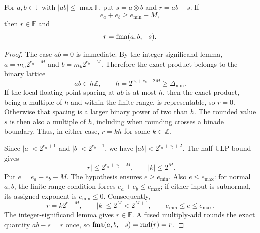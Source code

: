 \begin{theorem}
For $a, b\in\mathbb F$ with $|ab|\le\max\mathbb F$, put
$s=a\otimes b$ and $r=ab-s$. If
\[
 e_a+e_b\ge e_{\min}+M,
\]
then $r\in\mathbb F$ and
\[
 r=\operatorname{fma}(a, b, -s).
\]
\end{theorem}
\begin{proof}
The case $ab=0$ is immediate. By the integer-significand
lemma, $a=m_a2^{e_a-M}$ and $b=m_b2^{e_b-M}$.
Therefore the exact product belongs to the binary lattice
\[
 ab\in h\mathbb Z, \qquad h=2^{e_a+e_b-2M}
 \ge\Delta_{\min}.
\]
If the local floating-point spacing at $ab$ is at most $h$,
then the exact product, being a multiple of $h$ and within the
finite range, is representable, so $r=0$. Otherwise that
spacing is a larger binary power of two than $h$.
The rounded value $s$ is then also a multiple of $h$,
including when rounding crosses a binade boundary.
Thus, in either case, $r=kh$ for some $k\in\mathbb Z$.

Since $|a|<2^{e_a+1}$ and $|b|<2^{e_b+1}$,
we have $|ab|<2^{e_a+e_b+2}$. The half-ULP bound gives
\[
 |r|\le2^{e_a+e_b-M}, \qquad |k|\le2^M.
\]
Put $e=e_a+e_b-M$. The hypothesis ensures $e\ge e_{\min}$.
Also $e\le e_{\max}$: for normal $a,b$, the finite-range
condition forces $e_a+e_b\le e_{\max}$; if either input
is subnormal, its assigned exponent is $e_{\min}\le0$.
Consequently,
\[
 r=k2^{e-M}, \qquad |k|\le2^M<2^{M+1},
 \qquad e_{\min}\le e\le e_{\max}.
\]
The integer-significand lemma gives $r\in\mathbb F$.
A fused multiply-add rounds the exact quantity $ab-s=r$
once, so $\operatorname{fma}(a, b, -s)=\operatorname{rnd}(r)=r$.
\end{proof}

